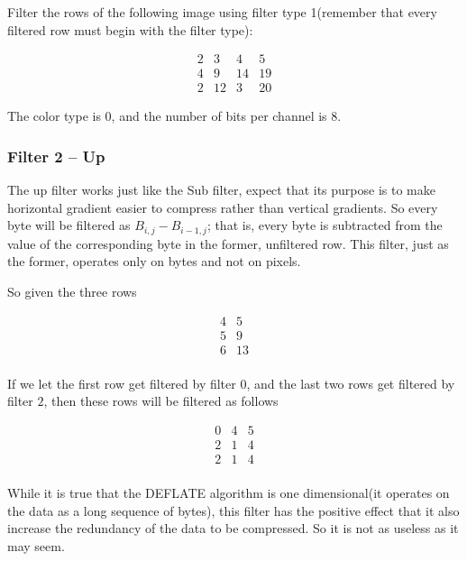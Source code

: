 \begin{Exercise}[label={filter-1}]

  Filter the rows of the following image using filter type 1(remember
  that every filtered row must begin with the filter type):

\[
 \begin{matrix}
  2 & 3 & 4 & 5 \\
  4 & 9 & 14 & 19 \\
  2 & 12 & 3 & 20
 \end{matrix}
\]

The color type is $0$, and the number of bits per channel is $8$.


\end{Exercise}

\subsubsection{Filter 2 -- Up}

The up filter works just like the Sub filter, expect that its purpose
is to make horizontal gradient easier to compress rather than vertical
gradients. So every byte will be filtered as $B_{i,j} - B_{i-1,j}$;
that is, every byte is subtracted from the value of the corresponding
byte in the former, unfiltered row. This filter, just as the former,
operates only on bytes and not on pixels.

So given the three rows

\[
 \begin{matrix}
  4 & 5 \\
  5 & 9 \\
  6 & 13 \\
 \end{matrix}
\]

If we let the first row get filtered by filter $0$, and the last two
rows get filtered by filter $2$, then these rows will be filtered as
follows

\[
 \begin{matrix}
  0 & 4 & 5 \\
  2 & 1 & 4 \\
  2 & 1 & 4 \\
 \end{matrix}
\]

While it is true that the DEFLATE algorithm is one dimensional(it
operates on the data as a long sequence of bytes), this filter has the
positive effect that it also increase the redundancy of the data to be
compressed. So it is not as useless as it may seem.

